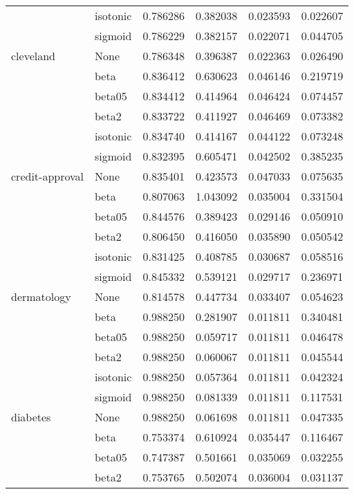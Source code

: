 \begin{tabular}{llrrrr}
        & isotonic &  0.786286 &   0.382038 &  0.023593 &  0.022607 \\
        & sigmoid &  0.786229 &   0.382157 &  0.022071 &  0.044705 \\
cleveland & None &  0.786348 &   0.396387 &  0.022363 &  0.026490 \\
        & beta &  0.836412 &   0.630623 &  0.046146 &  0.219719 \\
        & beta05 &  0.834412 &   0.414964 &  0.046424 &  0.074457 \\
        & beta2 &  0.833722 &   0.411927 &  0.046469 &  0.073382 \\
        & isotonic &  0.834740 &   0.414167 &  0.044122 &  0.073248 \\
        & sigmoid &  0.832395 &   0.605471 &  0.042502 &  0.385235 \\
credit-approval & None &  0.835401 &   0.423573 &  0.047033 &  0.075635 \\
        & beta &  0.807063 &   1.043092 &  0.035004 &  0.331504 \\
        & beta05 &  0.844576 &   0.389423 &  0.029146 &  0.050910 \\
        & beta2 &  0.806450 &   0.416050 &  0.035890 &  0.050542 \\
        & isotonic &  0.831425 &   0.408785 &  0.030687 &  0.058516 \\
        & sigmoid &  0.845332 &   0.539121 &  0.029717 &  0.236971 \\
dermatology & None &  0.814578 &   0.447734 &  0.033407 &  0.054623 \\
        & beta &  0.988250 &   0.281907 &  0.011811 &  0.340481 \\
        & beta05 &  0.988250 &   0.059717 &  0.011811 &  0.046478 \\
        & beta2 &  0.988250 &   0.060067 &  0.011811 &  0.045544 \\
        & isotonic &  0.988250 &   0.057364 &  0.011811 &  0.042324 \\
        & sigmoid &  0.988250 &   0.081339 &  0.011811 &  0.117531 \\
diabetes & None &  0.988250 &   0.061698 &  0.011811 &  0.047335 \\
        & beta &  0.753374 &   0.610924 &  0.035447 &  0.116467 \\
        & beta05 &  0.747387 &   0.501661 &  0.035069 &  0.032255 \\
        & beta2 &  0.753765 &   0.502074 &  0.036004 &  0.031137 \\

\end{tabular}
